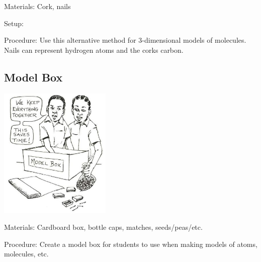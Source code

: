 \begin{multicols}{2}
\begin{description*}
\item[Materials:]{Cork, nails}
\item[Setup:]{}
\item[Procedure:]{Use this alternative method for 3-dimensional models of molecules. Nails can represent hydrogen atoms and the corks carbon.}
\end{description*}

\subsection{Model Box}

\begin{center}
\includegraphics[width=0.4\textwidth]{./img/source/model-box.jpg}
\end{center}

\begin{description*}
\item[Materials:]{Cardboard box, bottle caps, matches, seeds/peas/etc.}
\item[Procedure:]{Create a model box for students to use when making models of atoms, molecules, etc.}
\end{description*}


\end{multicols}
